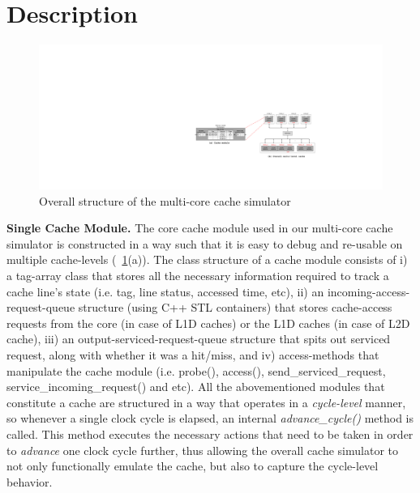 \documentclass[12pt]{report}
\newcommand{\Fig}[1]{\figurename~\ref{#1}}
\begin{document}
\newpage
\section{Description}
\begin{figure}[!h]
\begin{minipage}[b]{\textwidth}
 \centering
 \includegraphics[trim=0mm 0mm 0mm 0mm,clip,width=0.98\linewidth]{figs/cache_structure.pdf}
 \caption{Overall structure of the multi-core cache simulator}
 \label{fig:cache_structure}
\end{minipage}
\end{figure}

\textbf{Single Cache Module.} The core cache module used in our multi-core cache simulator is constructed in a way such that it is easy to debug and re-usable on multiple 
cache-levels (\Fig{fig:cache_structure}(a)). The class structure of a cache module consists of i) a tag-array
class that stores all the necessary information required to track a cache line's state (i.e. tag, line status, accessed time, etc), 
ii) an incoming-access-request-queue structure (using C++ STL containers) that stores cache-access requests from the core (in case of L1D caches) or
the L1D caches (in case of L2D cache), iii) an output-serviced-request-queue structure that spits out serviced request, along with whether
it was a hit/miss, and iv) access-methods that manipulate the cache module (i.e. probe(), access(), send\_serviced\_request, service\_incoming\_request()
and etc). All the abovementioned modules that constitute a cache are structured in a way that operates in a \emph{cycle-level} manner, 
so whenever a single clock cycle is elapsed, an internal \emph{advance\_cycle()} method is called. This method executes the necessary actions that
need to be taken in order to \emph{advance} one clock cycle further, thus allowing the overall cache simulator to not only functionally
emulate the cache, but also to capture the cycle-level behavior. 
\end{document}
